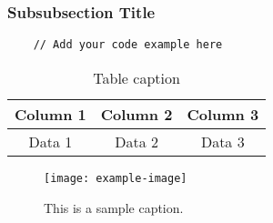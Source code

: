 \documentclass[12pt]{article} %
\begin{document}
\subsubsection{Subsubsection Title}

\begin{lstlisting}
    // Add your code example here
\end{lstlisting}

\begin{table}[h]
    \centering
    \begin{tabular}{|c|c|c|}
    \hline
    Column 1 & Column 2 & Column 3 \\ \hline
    Data 1 & Data 2 & Data 3 \\ \hline
    \end{tabular}
    \caption{Table caption}
\end{table}

\begin{figure}[h]
    \centering
    \texttt{[image: example-image]} %
    \caption{This is a sample caption.}
    \label{fig:example}
\end{figure}
\end{document}
